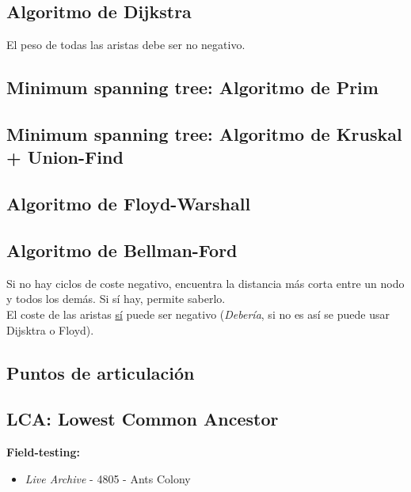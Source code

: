 \documentclass[10pt,letterpaper,twocolumn]{article}
\newcommand{\codigofuente}[1]{

\dotfill
}
\begin{document}
\subsection{Algoritmo de Dijkstra}
El peso de todas las aristas debe ser no negativo.
\codigofuente{./src/grafos/dijkstra.cpp}

\subsection{Minimum spanning tree: Algoritmo de Prim}

\codigofuente{./src/grafos/prim.cpp}

\subsection{Minimum spanning tree: Algoritmo de Kruskal + Union-Find}
\codigofuente{./src/grafos/kruskal.cpp}

\subsection{Algoritmo de Floyd-Warshall}
\codigofuente{./src/grafos/floyd.cpp}

\subsection{Algoritmo de Bellman-Ford}
Si no hay ciclos de coste negativo, encuentra la distancia más corta
entre un nodo y todos los demás. Si sí hay, permite saberlo. \\ El
coste de las aristas \underline{sí} puede ser negativo
(\emph{Debería}, si no es así se puede usar Dijsktra o Floyd).
\codigofuente{./src/grafos/bellman.cpp}

\subsection{Puntos de articulación}
\codigofuente{./src/grafos/puntos_articulacion.cpp}

\subsection{LCA: Lowest Common Ancestor}

\small
\textbf{Field-testing:}
\begin{itemize}
\item \emph{Live Archive} - 4805 - Ants Colony
\end{itemize}
\normalsize
\end{document}
